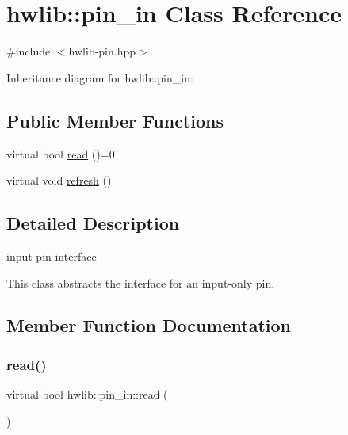 \hypertarget{classhwlib_1_1pin__in}{}\section{hwlib\+:\+:pin\+\_\+in Class Reference}
\label{classhwlib_1_1pin__in}


{\ttfamily \#include $<$hwlib-\/pin.\+hpp$>$}



Inheritance diagram for hwlib\+:\+:pin\+\_\+in\+:
\subsection*{Public Member Functions}
\begin{DoxyCompactItemize}
\item 
virtual bool \hyperlink{classhwlib_1_1pin__in_ad071bd2e17bb4af51390f6cbb728a194}{read} ()=0
\item 
virtual void \hyperlink{classhwlib_1_1pin__in_a3fb1bfb1ec962bb6d31a5e865f0d0acb}{refresh} ()
\end{DoxyCompactItemize}


\subsection{Detailed Description}
input pin interface

This class abstracts the interface for an input-\/only pin. 

\subsection{Member Function Documentation}
\mbox{\label{classhwlib_1_1pin__in_ad071bd2e17bb4af51390f6cbb728a194}} 
\subsubsection{\texorpdfstring{read()}{read()}}
{\footnotesize\ttfamily virtual bool hwlib\+::pin\+\_\+in\+::read (\begin{DoxyParamCaption}{ }\end{DoxyParamCaption})\hspace{0.3cm}{\ttfamily [pure virtual]}}





